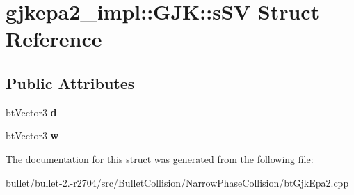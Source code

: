 \hypertarget{structgjkepa2__impl_1_1_g_j_k_1_1s_s_v}{\section{gjkepa2\+\_\+impl\+:\+:G\+J\+K\+:\+:s\+S\+V Struct Reference}
\label{structgjkepa2__impl_1_1_g_j_k_1_1s_s_v}
}
\subsection*{Public Attributes}
\begin{DoxyCompactItemize}
\item 
\hypertarget{structgjkepa2__impl_1_1_g_j_k_1_1s_s_v_ac8906ecfd952ed195ec56f61681eb358}{bt\+Vector3 {\bfseries d}}\label{structgjkepa2__impl_1_1_g_j_k_1_1s_s_v_ac8906ecfd952ed195ec56f61681eb358}

\item 
\hypertarget{structgjkepa2__impl_1_1_g_j_k_1_1s_s_v_abdd688f396857f3993703df93fdcae56}{bt\+Vector3 {\bfseries w}}\label{structgjkepa2__impl_1_1_g_j_k_1_1s_s_v_abdd688f396857f3993703df93fdcae56}

\end{DoxyCompactItemize}


The documentation for this struct was generated from the following file\+:\begin{DoxyCompactItemize}
\item 
bullet/bullet-\/2.-\/r2704/src/\+Bullet\+Collision/\+Narrow\+Phase\+Collision/bt\+Gjk\+Epa2.\+cpp\end{DoxyCompactItemize}
